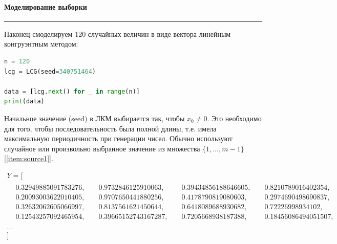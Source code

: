 \documentclass[a4paper, 14pt]{extarticle}
\begin{document}
\paragraph{Моделирование выборки}\vspace{-20pt}\rule{\linewidth}{0.1mm}

Наконец смоделируем 120 случайных величин в виде вектора линейным конгруэнтным методом:\\
\begin{lstlisting}[language=Python]
n = 120
lcg = LCG(seed=340751464)

data = [lcg.next() for _ in range(n)]
print(data)
\end{lstlisting}
\vspace{10pt}
Начальное значение (seed) в ЛКМ выбирается так, чтобы $x_0 \neq 0$. Это необходимо для того, чтобы 
последовательность была полной длины, т.е. имела максимальную периодичность 
при генерации чисел. Обычно используют случайное или произвольно выбранное 
значение из множества $\{1, ..., m - 1\}$ [\ref{item:source1}]. 

\noindent
\begin{adjustbox}{max width=1\textwidth}
  \parbox{\linewidth}{%
    \begin{gather*}
      Y = [ \\
      \begin{aligned}
        & 0.32949885091783276, & \hspace{3pt} & 0.9732846125910063,  & \hspace{3pt} & 0.39434856188646605, & \hspace{3pt} & 0.8210789016402354,  & \\
        & 0.20093003622010405, & \hspace{3pt} & 0.9707650441880256,  & \hspace{3pt} & 0.4178790819080603,  & \hspace{3pt} & 0.2974690498690837,  & \\
        & 0.32632062605066997, & \hspace{3pt} & 0.8137561621450644,  & \hspace{3pt} & 0.6418089688930682,  & \hspace{3pt} & 0.72226998934102,    & \\
        & 0.12543257092465954, & \hspace{3pt} & 0.39665152743167287, & \hspace{3pt} & 0.7205668938187388,  & \hspace{3pt} & 0.18456086494051507, & \\ 
      \end{aligned} \\
      ...\\
      ]
    \end{gather*}
  }
\end{adjustbox}
\end{document}
